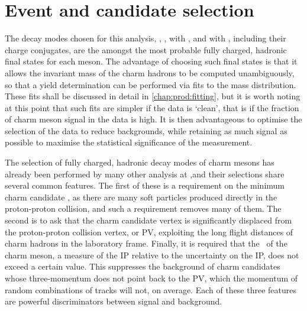 \chapter{Event and candidate selection}
\label{chap:prod:sel}

The decay modes chosen for this analysis,
\DzToKpi, \DpToKpipi, \DspTophipi with \phiToKK, and \DstToDzpi with \DzToKpi, 
including their charge conjugates, are the amongst the most probable fully 
charged, hadronic final states for each meson.
The advantage of choosing such final states is that it allows the invariant 
mass of the charm hadrons to be computed unambiguously, so that a yield 
determination can be performed via fits to the mass distribution.
These fits shall be discussed in detail in \cref{chap:prod:fitting}, but it is 
worth noting at this point that such fits are simpler if the data is `clean', 
that is if the fraction of charm meson signal in the data is high.
It is then advantageous to optimise the selection of the data to reduce 
backgrounds, while retaining as much signal as possible to maximise the 
statistical significance of the measurement.

The selection of fully charged, hadronic decay modes of charm mesons has 
already been performed by many other analysis at \lhcb,\footnotemark and their 
selections share several common features.
The first of these is a requirement on the minimum charm candidate \pT, as 
there are many soft particles produced directly in the proton-proton collision, 
and such a requirement removes many of them.
The second is to ask that the charm candidate vertex is significantly displaced 
from the proton-proton collision vertex, or \ac{PV}, exploiting the long flight 
distances of charm hadrons in the laboratory frame.
Finally, it is required that the \ipchisq\ of the charm meson, a measure of the 
\acf{IP} relative to the uncertainty on the \ac{IP}, does not exceed a certain 
value.
This suppresses the background of charm candidates whose three-momentum does 
not point back to the \ac{PV}, which the momentum of random combinations of 
tracks will not, on average.
Each of these three features are powerful discriminators between signal and 
background.


